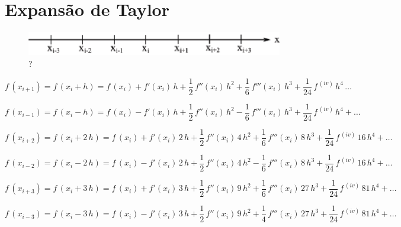 \section{Expansão de Taylor}

\begin{figure}[htb]
 \centering
 \includegraphics[scale=1.0]{capitulos/capitulo3/figuras/exp_taylor1.eps}
 \caption{?}
 \label{fig:exp_taylor1}
\end{figure}

\begin{equation}
 \label{cap3:sec1:eq1}
 f\,(x_{i+1}) = f\,(x_i+h) = f\,(x_i) + f'(x_i)\,h + \displaystyle \frac{1}{2}\,f''(x_i)\,h^2 + \frac{1}{6}\,f'''(x_i)\,h^3 + \frac{1}{24}\,f^{\,(iv)}\,h^4 \, \ldots
\end{equation}

\begin{equation}
 \label{cap3:sec1:eq2}
 f\,(x_{i-1}) = f\,(x_i-h) = f\,(x_i) - f'(x_i)\,h + \displaystyle \frac{1}{2}\,f''(x_i)\,h^2 - \frac{1}{6}\,f'''(x_i)\,h^3 + \frac{1}{24}\,f^{\,(iv)}\,h^4 + \ldots
\end{equation}

\begin{equation}
 \label{cap3:sec1:eq3}
 f\,(x_{i+2}) = f\,(x_i+2\,h) = f\,(x_i) + f'(x_i)\,2\,h + \displaystyle \frac{1}{2}\,f''(x_i)\,4\,h^2 + \frac{1}{6}\,f'''(x_i)\,8\,h^3 + \frac{1}{24}\,f^{\,(iv)}\,16\,h^4 + \ldots
\end{equation}

\begin{equation}
 \label{cap3:sec1:eq4}
 f\,(x_{i-2}) = f\,(x_i-2\,h) = f\,(x_i) - f'(x_i)\,2\,h + \displaystyle \frac{1}{2}\,f''(x_i)\,4\,h^2 - \frac{1}{6}\,f'''(x_i)\,8\,h^3 + \frac{1}{24}\,f^{\,(iv)}\,16\,h^4 + \ldots
\end{equation}

\begin{equation}
 \label{cap3:sec1:eq5}
 f\,(x_{i+3}) = f\,(x_i+3\,h) = f\,(x_i) + f'(x_i)\,3\,h + \displaystyle \frac{1}{2}\,f''(x_i)\,9\,h^2 + \frac{1}{6}\,f'''(x_i)\,27\,h^3 + \frac{1}{24}\,f^{\,(iv)}\,81\,h^4 + \ldots
\end{equation}

\begin{equation}
 \label{cap3:sec1:eq6}
 f\,(x_{i-3}) = f\,(x_i-3\,h) = f\,(x_i) - f'(x_i)\,3\,h + \displaystyle \frac{1}{2}\,f''(x_i)\,9\,h^2 + \frac{1}{4}\,f'''(x_i)\,27\,h^3 + \frac{1}{24}\,f^{\,(iv)}\,81\,h^4 + \ldots
\end{equation}

